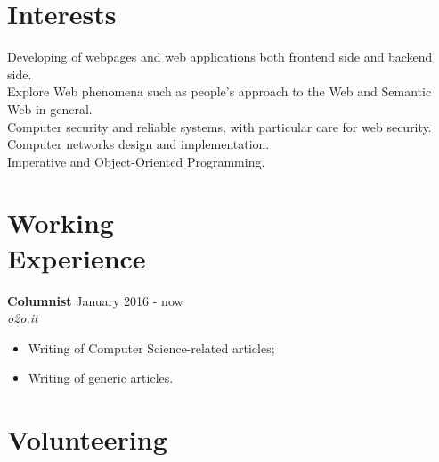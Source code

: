 \documentclass[margin, 10pt]{res}
\begin{document}
\begin{resume}

\section{Interests}
Developing of webpages and web applications both frontend side and backend side. \\
Explore Web phenomena such as people's approach to the Web and Semantic Web in general. \\
Computer security and reliable systems, with particular care for web security. \\
Computer networks design and implementation. \\
Imperative and Object-Oriented Programming. \\



 
\section{Working \\ Experience}

\textbf{Columnist} \hfill January 2016 - now \\
\textit{o2o.it}
\begin{itemize}
\item Writing of Computer Science-related articles;
\item Writing of generic articles.
\end{itemize} 



\section{Volunteering}


\end{resume}
\end{document}
